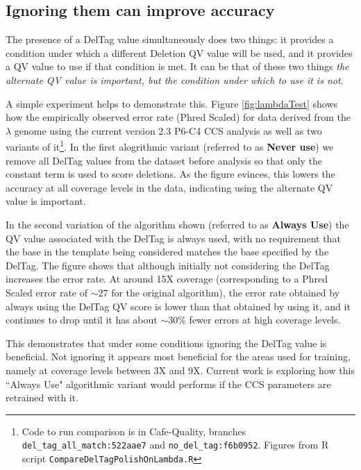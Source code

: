 \documentclass[fleqn,10pt]{SelfArx} %
\begin{document}
\subsection{Ignoring them can improve accuracy}

The presence of a DelTag value simultaneously does two things: it provides a condition under which a different Deletion QV value will be used, and it provides a QV value to use if that condition is met.  It can be that of these two things \textit{the alternate QV value is important, but the condition under which to use it is not}.

A simple experiment helps to demonstrate this.  Figure \ref{fig:lambdaTest} shows how the empirically observed error rate (Phred Scaled) for data derived from the $\lambda$ genome using the current version 2.3 P6-C4 CCS analysis as well as two variants of it\footnote{Code to run comparison is in Cafe-Quality, branches \texttt{del\_tag\_all\_match:522aae7} and \texttt{no\_del\_tag:f6b0952}.  Figures from R script \texttt{CompareDelTagPolishOnLambda.R}}.  In the first alogrithmic variant (referred to as \textbf{Never use}) we remove all DelTag values from the dataset before analysis so that only the constant term is used to score deletions.  As the figure evinces, this lowers the accuracy at all coverage levels in the data, indicating using the alternate QV value is important.

In the second variation of the algorithm shown (referred to as \textbf{Always Use}) the QV value associated with the DelTag is always used, with no requirement that the base in the template being considered matches the base specified by the DelTag.  The figure shows that although initially not considering the DelTag increases the error rate.  At around 15X coverage (corresponding to a Phred Scaled error rate of $\sim27$ for the original algorithm), the error rate obtained by always using the DelTag QV score is lower than that obtained by using it, and it continues to drop until it has about $\sim30\%$ fewer errors at high coverage levels. 

This demonstrates that under some conditions ignoring the DelTag value is beneficial.  Not ignoring it appears most beneficial for the areas used for training, namely at coverage levels between 3X and 9X.  Current work is exploring how this ``Always Use" algorithmic variant would performs if the CCS parameters are retrained with it.
\end{document}
